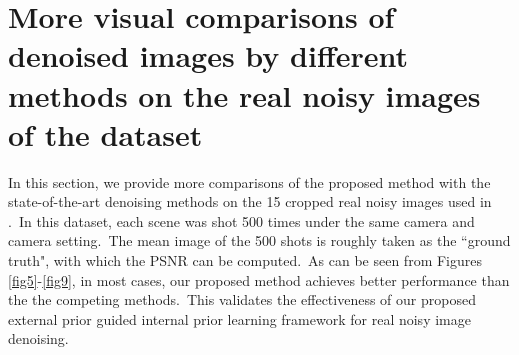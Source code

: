 \documentclass[10pt,onecolumn,letterpaper]{article}
\begin{document}
\section{More visual comparisons of denoised images by different methods on the real noisy images of the dataset \cite{crosschannel2016}}

In this section, we provide more comparisons of the proposed method with the state-of-the-art denoising methods on the 15 cropped real noisy images used in \cite{crosschannel2016}.\ In this dataset, each scene was shot 500 times under the same camera and camera setting.\ The mean image of the 500 shots is roughly taken as the ``ground truth", with which the PSNR can be computed.\ As can be seen from Figures \ref{fig5}-\ref{fig9}, in most cases, our proposed method achieves better performance than the the competing methods.\ This validates the effectiveness of our proposed external prior guided internal prior learning framework for real noisy image denoising.
\end{document}
